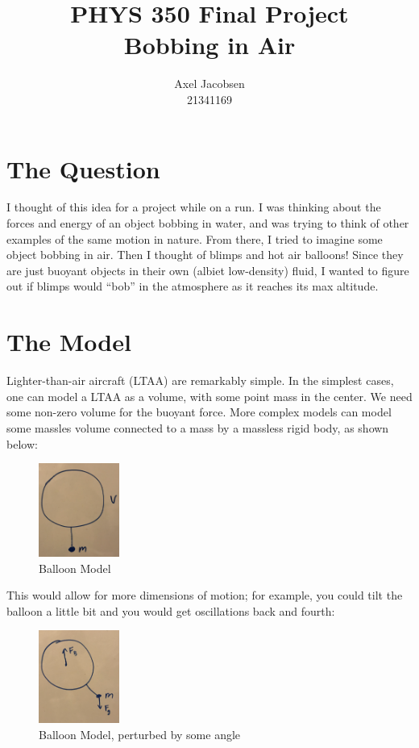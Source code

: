 \documentclass[titlepage]{article}
\begin{document}
\title{
    PHYS 350 Final Project \\
    \large Bobbing in Air
}
\author{Axel Jacobsen \\ 21341169}
\maketitle

\tableofcontents
\newpage

\section{The Question}

I thought of this idea for a project while on a run. I was thinking about the forces and energy of an object bobbing in water, and was trying to think of other examples of the same motion in nature. From there, I tried to imagine some object bobbing in air. Then I thought of blimps and hot air balloons! Since they are just buoyant objects in their own (albiet low-density) fluid, I wanted to figure out if blimps would ``bob'' in the atmosphere as it reaches its max altitude.

\section{The Model}

Lighter-than-air aircraft (LTAA) are remarkably simple. In the simplest cases, one can model a LTAA as a volume, with some point mass in the center. We need some non-zero volume for the buoyant force. More complex models can model some massles volume connected to a mass by a massless rigid body, as shown below:

\begin{figure}[h]
    \centering
    \includegraphics[width=100px]{balloon.png}
    \caption{Balloon Model}
\end{figure}

This would allow for more dimensions of motion; for example, you could tilt the balloon a little bit and you would get oscillations back and fourth:

\begin{figure}[h]
    \centering
    \includegraphics[width=100px]{balloon_angle.png}
    \caption{Balloon Model, perturbed by some angle}
\end{figure}
\end{document}
